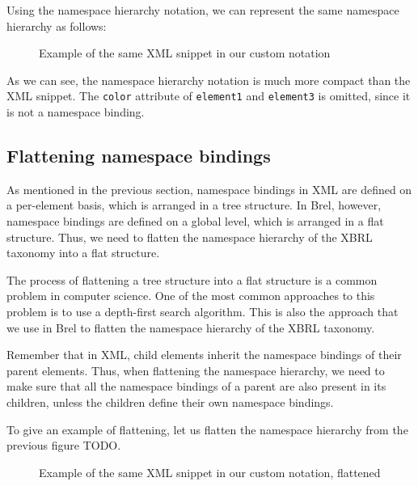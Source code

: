 Using the namespace hierarchy notation, we can represent the same namespace hierarchy as follows:

\begin{figure}[H]
    \caption{Example of the same XML snippet in our custom notation}
    \label{fig:custom_namespace_notation_example}
\end{figure}

As we can see, the namespace hierarchy notation is much more compact than the XML snippet.
The \texttt{color} attribute of \texttt{element1} and \texttt{element3} is omitted, since it is not a namespace binding.

\subsection{Flattening namespace bindings}

As mentioned in the previous section, namespace bindings in XML are defined on a per-element basis,
which is arranged in a tree structure.
In Brel, however, namespace bindings are defined on a global level, which is arranged in a flat structure.
Thus, we need to flatten the namespace hierarchy of the XBRL taxonomy into a flat structure.

The process of flattening a tree structure into a flat structure is a common problem in computer science.
One of the most common approaches to this problem is to use a depth-first search algorithm.
This is also the approach that we use in Brel to flatten the namespace hierarchy of the XBRL taxonomy.

Remember that in XML, child elements inherit the namespace bindings of their parent elements.
Thus, when flattening the namespace hierarchy, we need to make sure that
all the namespace bindings of a parent are also present in its children, 
unless the children define their own namespace bindings.

To give an example of flattening, let us flatten the namespace hierarchy from the previous figure TODO.

\begin{figure}[H]
    \caption{Example of the same XML snippet in our custom notation, flattened}
    \label{fig:custom_namespace_notation_example_flattened}
\end{figure}

